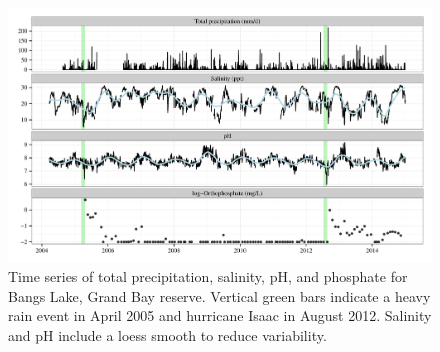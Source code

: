 \documentclass[letterpaper,12pt]{article}\usepackage[]{graphicx}\usepackage[]{color}
\makeatletter
\def\maxwidth{ %
  \ifdim\Gin@nat@width>\linewidth
    \linewidth
  \else
    \Gin@nat@width
  \fi
}
\makeatother
\begin{document}
\begin{landscape}
\centering\vspace*{\fill}
\begin{figure}[!ht]

{\centering \includegraphics[width=\maxwidth]{figs/tsplot-1} 

}

\caption[Time series of total precipitation, salinity, pH, and phosphate for Bangs Lake, Grand Bay reserve]{Time series of total precipitation, salinity, pH, and phosphate for Bangs Lake, Grand Bay reserve.  Vertical green bars indicate a heavy rain event in April 2005 and hurricane Isaac in August 2012.  Salinity and pH include a loess smooth to reduce variability.}\label{fig:tsplot}
\end{figure}


\end{landscape}
\clearpage
\end{document}
